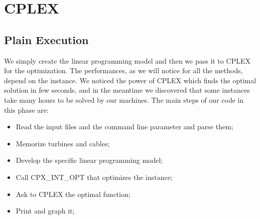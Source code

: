 
\chapter{CPLEX}

\label{chp:3-CPLEX}

\section{Plain Execution}
We simply create the linear programming model and then we pass it to \textsc{CPLEX} for the optimization. The performances, as we will notice for all the methods, depend on the instance. We noticed the power of \textsc{CPLEX} which finds the optimal solution in few seconds, and in the meantime we discovered that some instances take many hours to be solved by our machines. 
The main steps of our code in this phase are: 
\begin{itemize}
\item Read the input files and the command line parameter and parse them;
\item Memorize turbines and cables;
\item Develop the specific linear programming model;
\item Call CPX\_INT\_OPT that optimizes the instance;
\item Ask to \textsc{CPLEX} the optimal function;
\item Print and graph it;
\end{itemize}

